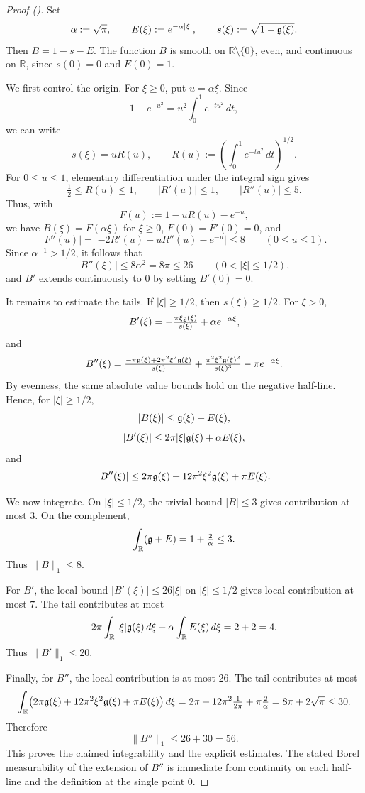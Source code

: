 \documentclass[12pt,reqno]{amsart}
\newcommand{\auto}{{({\tiny\faCar})}}
\theoremstyle{plain}
\numberwithin{equation}{section}
\theoremstyle{remark}
\newcommand{\R}{{\mathbb R}}
\begin{document}
\begin{proof}[Proof \auto]
Set
\[
    \alpha:=\sqrt{\pi},\qquad
    E(\xi):=e^{-\alpha|\xi|},\qquad
    s(\xi):=\sqrt{1-\mathfrak{g}(\xi)}.
\]
Then \(B=1-s-E\). The function \(B\) is smooth on \(\R\setminus\{0\}\), even, and
continuous on \(\R\), since \(s(0)=0\) and \(E(0)=1\).

We first control the origin. For \(\xi\ge0\), put \(u=\alpha \xi\). Since
\[
    1-e^{-u^2}=u^2\int_0^1 e^{-tu^2}\,dt,
\]
we can write
\[
    s(\xi)=uR(u),\qquad
    R(u):=\left(\int_0^1 e^{-tu^2}\,dt\right)^{1/2}.
\]
For \(0\le u\le1\), elementary differentiation under the integral sign gives
\[
    \tfrac12\le R(u)\le1,\qquad |R'(u)|\le1,\qquad |R''(u)|\le5.
\]
Thus, with
\[
    F(u):=1-uR(u)-e^{-u},
\]
we have \(B(\xi)=F(\alpha\xi)\) for \(\xi\ge0\), \(F(0)=F'(0)=0\), and
\[
    |F''(u)|
    =
    |-2R'(u)-uR''(u)-e^{-u}|
    \le 8
    \qquad (0\le u\le1).
\]
Since \(\alpha^{-1}>1/2\), it follows that
\[
    |B''(\xi)|\le 8\alpha^2=8\pi\le26
    \qquad (0<|\xi|\le1/2),
\]
and \(B'\) extends continuously to \(0\) by setting \(B'(0)=0\).

It remains to estimate the tails. If \(|\xi|\ge1/2\), then \(s(\xi)\ge1/2\). For \(\xi>0\),
\[
    B'(\xi)
    =
    -\tfrac{\pi\xi\mathfrak{g}(\xi)}{s(\xi)}
    +
    \alpha e^{-\alpha\xi},
\]
and
\[
    B''(\xi)
    =
    \tfrac{-\pi\mathfrak{g}(\xi)+2\pi^2\xi^2\mathfrak{g}(\xi)}{s(\xi)}
    +
    \tfrac{\pi^2\xi^2\mathfrak{g}(\xi)^2}{s(\xi)^3}
    -
    \pi e^{-\alpha\xi}.
\]
By evenness, the same absolute value bounds hold on the negative half-line. Hence, for
\(|\xi|\ge1/2\),
\[
    |B(\xi)|\le \mathfrak{g}(\xi)+E(\xi),
\]
\[
    |B'(\xi)|\le 2\pi|\xi|\mathfrak{g}(\xi)+\alpha E(\xi),
\]
and
\[
    |B''(\xi)|
    \le
    2\pi\mathfrak{g}(\xi)+12\pi^2\xi^2\mathfrak{g}(\xi)+\pi E(\xi).
\]

We now integrate. On \(|\xi|\le1/2\), the trivial bound \(|B|\le3\) gives contribution at
most \(3\). On the complement,
\[
    \int_\R(\g+E)
    =
    1+\tfrac{2}{\alpha}
    \le3.
\]
Thus \(\|B\|_1\le8\).

For \(B'\), the local bound \(|B'(\xi)|\le26|\xi|\) on \(|\xi|\le1/2\) gives local
contribution at most \(7\). The tail contributes at most
\[
    2\pi\int_\R |\xi|\g(\xi)\,d\xi
    +
    \alpha\int_\R E(\xi)\,d\xi
    =
    2+2=4.
\]
Thus \(\|B'\|_1\le20\).

Finally, for \(B''\), the local contribution is at most \(26\). The tail contributes at most
\[
\int_\R \bigl(2\pi\g(\xi)+12\pi^2\xi^2\g(\xi)+\pi E(\xi)\bigr)\,d\xi = 2\pi+12\pi^2\tfrac{1}{2\pi}+\pi\tfrac{2}{\alpha} = 8\pi+2\sqrt{\pi} \le30.
\]
Therefore
\[
    \|B''\|_1\le 26+30=56.
\]
This proves the claimed integrability and the explicit estimates. The stated Borel measurability
of the extension of \(B''\) is immediate from continuity on each half-line and the definition at
the single point \(0\).
\end{proof}
\end{document}
